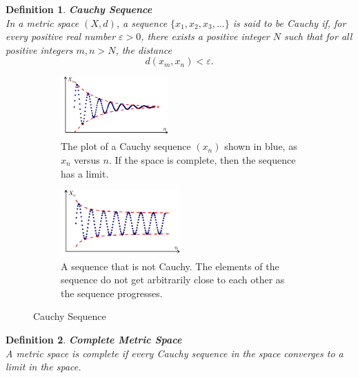 \documentclass[11pt]{book} %
\newtheorem{definition}{Definition}[section]
\begin{document}
\begin{definition}{\textbf{Cauchy Sequence}} \\
    In a metric space \( (X, d) \), a sequence \( \{x_1, x_2, x_3, \ldots\} \) is said to be \emph{Cauchy} if, for every positive real number \( \varepsilon > 0 \),
     there exists a positive integer \( N \) such that for all positive integers \( m, n > N \), the distance
    \[ d(x_m, x_n) < \varepsilon. \]
\end{definition}

\begin{figure}[H]
    \begin{subfigure}{0.5\textwidth}
        \centering
        \includegraphics[width=0.45\textwidth]{Figs/Cauchy_sequence_illustration.png}
        \caption{The plot of a Cauchy sequence \( (x_n) \) shown in blue, as \( x_n \) versus \( n \). If the space is complete, then the sequence has a limit.}
    \end{subfigure}
    \hfill
    \begin{subfigure}{0.45\textwidth}
        \centering
        \includegraphics[width=0.5\textwidth]{Figs/Cauchy_sequence_illustration2.png}
        \caption{A sequence that is not Cauchy. The elements of the sequence do not get arbitrarily close to each other as the sequence progresses.}
    \end{subfigure}
    \caption{Cauchy Sequence}
\end{figure}

\begin{definition}{\textbf{Complete Metric Space}} \\
    A metric space is complete if every Cauchy sequence in the space converges to a limit in the space.
\end{definition}
\end{document}
